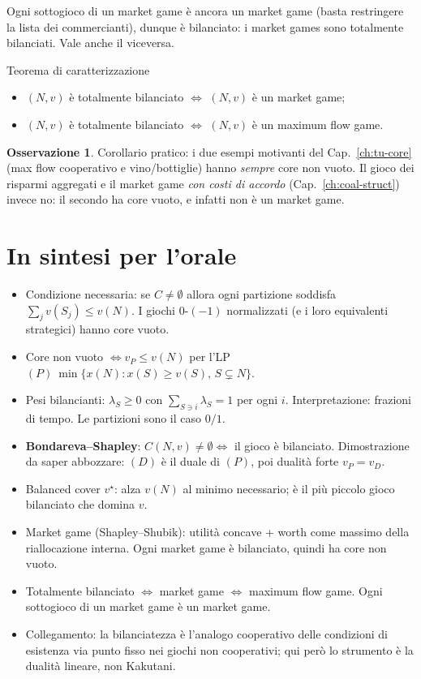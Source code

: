 \documentclass[12pt,a4paper,twoside]{book}
\theoremstyle{plain}
\theoremstyle{definition}
\newtheorem{remark}[theorem]{Osservazione}
\begin{document}
Ogni sottogioco di un market game è ancora un market game (basta restringere la
lista dei commercianti), dunque è bilanciato: i market games sono totalmente
bilanciati. Vale anche il viceversa.

\begin{thmbox}{Teorema di caratterizzazione}
\begin{itemize}
  \item[(i)] $(N,v)$ è totalmente bilanciato $\iff$ $(N,v)$ è un market game;
  \item[(ii)] $(N,v)$ è totalmente bilanciato $\iff$ $(N,v)$ è un maximum flow game.
\end{itemize}
\end{thmbox}

\begin{remark}
Corollario pratico: i due esempi motivanti del Cap.~\ref{ch:tu-core} (max flow
cooperativo e vino/bottiglie) hanno \emph{sempre} core non vuoto. Il gioco dei
risparmi aggregati e il market game \emph{con costi di accordo} (Cap.~\ref{ch:coal-struct})
invece no: il secondo ha core vuoto, e infatti non è un market game.
\end{remark}

\section*{In sintesi per l'orale}
\begin{itemize}
  \item Condizione necessaria: se $C\ne\emptyset$ allora ogni partizione soddisfa
        $\sum_j v(S_j)\le v(N)$. I giochi $0$-$(-1)$ normalizzati (e i loro
        equivalenti strategici) hanno core vuoto.
  \item Core non vuoto $\iff v_P\le v(N)$ per l'LP
        $(P)\ \min\{x(N):x(S)\ge v(S),\,S\subsetneq N\}$.
  \item Pesi bilancianti: $\lambda_S\ge 0$ con $\sum_{S\ni i}\lambda_S=1$ per ogni
        $i$. Interpretazione: frazioni di tempo. Le partizioni sono il caso
        $0/1$.
  \item \textbf{Bondareva--Shapley}: $C(N,v)\ne\emptyset\iff$ il gioco è bilanciato.
        Dimostrazione da saper abbozzare: $(D)$ è il duale di $(P)$, poi
        dualità forte $v_P=v_D$.
  \item Balanced cover $v^{\star}$: alza $v(N)$ al minimo necessario; è il più
        piccolo gioco bilanciato che domina $v$.
  \item Market game (Shapley--Shubik): utilità concave + worth come massimo
        della riallocazione interna. Ogni market game è bilanciato, quindi ha core non vuoto.
  \item Totalmente bilanciato $\iff$ market game $\iff$ maximum flow game. Ogni
        sottogioco di un market game è un market game.
  \item Collegamento: la bilanciatezza è l'analogo cooperativo delle condizioni
        di esistenza via punto fisso nei giochi non cooperativi; qui però lo
        strumento è la dualità lineare, non Kakutani.
\end{itemize}
\end{document}
